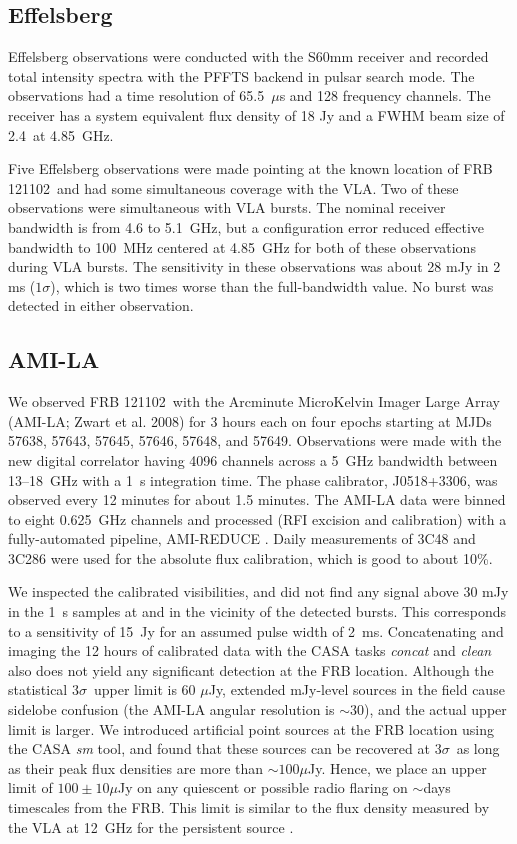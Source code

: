 \documentclass[twocolumn]{aastex61}
\newcommand{\frb}{FRB 121102}
\begin{document}
\subsection{Effelsberg}

Effelsberg observations were conducted with the S60mm receiver and recorded total intensity spectra with the PFFTS backend in pulsar search mode. The observations had a time resolution of 65.5~$\mu$s and 128 frequency channels. The receiver has a system equivalent flux density of 18 Jy and a FWHM beam size of 2.4\arcmin\ at 4.85~GHz. 

Five Effelsberg observations were made pointing at the known location of \frb\ and had some simultaneous coverage with the VLA. Two of these observations were simultaneous with VLA bursts. The nominal receiver bandwidth is from 4.6 to 5.1~GHz, but a configuration error reduced effective bandwidth to 100~MHz centered at 4.85~GHz for both of these observations during VLA bursts. The sensitivity in these observations was about 28 mJy in 2 ms ($1\sigma$), which is two times worse than the full-bandwidth value. No burst was detected in either observation.

\subsection{AMI-LA}

We observed \frb\ with the Arcminute MicroKelvin Imager Large Array (AMI-LA; Zwart et al. 2008) for 3 hours each on four epochs starting at MJDs 57638, 57643, 57645, 57646, 57648, and 57649. Observations were made with the new digital correlator having 4096 channels across a 5~GHz bandwidth between 13--18~GHz with a 1~s integration time. The phase calibrator, J0518+3306, was observed every 12 minutes for about 1.5 minutes. The AMI-LA data were binned to eight 0.625~GHz channels and processed (RFI excision and calibration) with a fully-automated pipeline, AMI-REDUCE \citep[e.g.,][]{2013MNRAS.429.3330P}. Daily measurements of 3C48 and 3C286 were used for the absolute flux calibration, which is good to about 10\%. 

We inspected the calibrated visibilities, and did not find any signal above 30 mJy in the 1~s samples at and in the vicinity of the detected bursts. This corresponds to a sensitivity of 15~Jy for an assumed pulse width of 2~ms. Concatenating and imaging the 12 hours of calibrated data with the CASA tasks {\it concat} and {\it clean} also does not yield any significant detection at the FRB location. Although the statistical $3\sigma$\ upper limit is 60 $\mu$Jy, extended mJy-level sources in the field cause sidelobe confusion (the AMI-LA angular resolution is $\sim$30\arcsec), and the actual upper limit is larger. We introduced artificial point sources at the FRB location using the CASA {\it sm} tool, and found that these sources can be recovered at $3\sigma$\ as long as their peak flux densities are more than $\sim100\mu$Jy. Hence, we place an upper limit of $100\pm10 \mu$Jy on any quiescent or possible radio flaring on $\sim$days timescales from the FRB. This limit is similar to the flux density measured by the VLA at 12~GHz for the persistent source \citep{LOC}.
\end{document}
